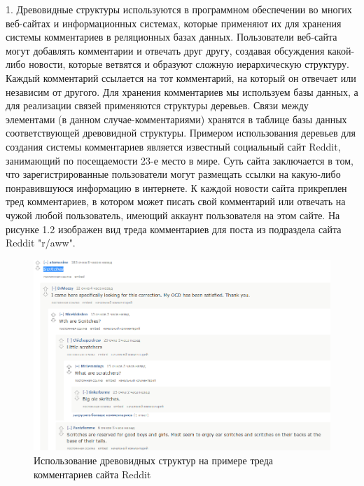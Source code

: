 \documentclass[a4paper,14pt]{extreport}
\theoremstyle{definition}
\begin{document}
1. Древовидные структуры используются в программном обеспечении во многих веб-сайтах и информационных системах, которые применяют их для хранения системы комментариев в реляционных базах данных.
Пользователи веб-сайта могут добавлять комментарии и отвечать друг другу, создавая обсуждения какой-либо новости, которые ветвятся и образуют сложную иерархическую структуру. Каждый комментарий ссылается на тот комментарий, на который он отвечает или независим от другого. Для хранения комментариев мы используем базы данных, а для реализации связей применяются структуры деревьев. Связи между элементами (в данном случае-комментариями) хранятся в таблице базы данных соответствующей древовидной структуры. Примером использования деревьев для создания системы комментариев является известный социальный сайт Reddit, занимающий по посещаемости 23-е место в мире\cite{Alexa}. Суть сайта заключается в том, что зарегистрированные пользователи могут размещать ссылки на какую-либо понравившуюся информацию в интернете. К каждой новости сайта прикреплен тред комментариев, в котором может писать свой комментарий или отвечать на чужой любой пользователь, имеющий аккаунт пользователя на этом сайте. На рисунке 1.2 изображен вид треда комментариев для поста из подраздела сайта Reddit "r/aww".

\begin{figure}[h!]
\begin{center}
\includegraphics[width=12cm]{43.png}
\caption{Использование древовидных структур на примере треда комментариев сайта Reddit}
\label{fig:3}
\end{center}
\end{figure}
\end{document}
